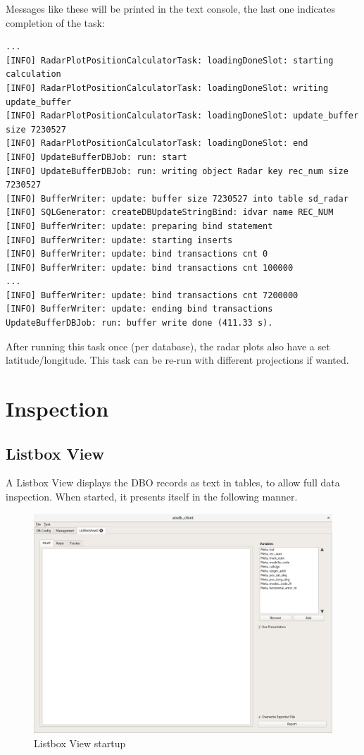 \documentclass[10pt,letterpaper,extrafontsizes]{memoir}
\begin{document}
Messages like these will be printed in the text console, the last one indicates completion of the task:

\begin{verbatim}
...
[INFO] RadarPlotPositionCalculatorTask: loadingDoneSlot: starting calculation
[INFO] RadarPlotPositionCalculatorTask: loadingDoneSlot: writing update_buffer
[INFO] RadarPlotPositionCalculatorTask: loadingDoneSlot: update_buffer size 7230527
[INFO] RadarPlotPositionCalculatorTask: loadingDoneSlot: end
[INFO] UpdateBufferDBJob: run: start
[INFO] UpdateBufferDBJob: run: writing object Radar key rec_num size 7230527
[INFO] BufferWriter: update: buffer size 7230527 into table sd_radar
[INFO] SQLGenerator: createDBUpdateStringBind: idvar name REC_NUM
[INFO] BufferWriter: update: preparing bind statement
[INFO] BufferWriter: update: starting inserts
[INFO] BufferWriter: update: bind transactions cnt 0
[INFO] BufferWriter: update: bind transactions cnt 100000
...
[INFO] BufferWriter: update: bind transactions cnt 7200000
[INFO] BufferWriter: update: ending bind transactions
UpdateBufferDBJob: run: buffer write done (411.33 s).
\end{verbatim}

After running this task once (per database), the radar plots also have a set latitude/longitude. This task can be re-run with different projections if wanted.

\section{Inspection}
\label{sec:inspection}

\subsection{Listbox View}
\label{sec:listbox_view}
A Listbox View displays the DBO records as text in tables, to allow full data inspection. When started, it presents itself in the following manner.

\begin{figure}[H]
    \hspace*{-2cm}
    \includegraphics[width=18cm,frame]{../screenshots/listbox_start.png}
  \caption{Listbox View startup}
  \label{fig:listbox_start}
\end{figure}
\end{document}
